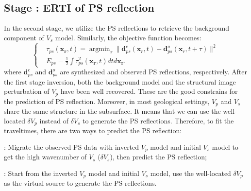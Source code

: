 \subsection{Stage \uppercase\expandafter{}: ERTI of PS reflection}
In the second stage, we utilize the PS reflections to retrieve the background component of
$V_s$ model. Similarly, the objective function becomes:
\begin{equation}
	\left\{
		\begin{aligned}
			&\tau_{ps}(\mathbf{x_r},t)=\mathop{\arg\min}_{\tau}
			\parallel\mathbf{d}^{c}_{ps}(\mathbf{x}_r,t)-\mathbf{d}^{o}_{ps}(\mathbf{x}_r,t+\tau)\parallel^2\\
			&E_{ps}=\frac{1}{2}\int\tau^2_{ps}(\mathbf{x_r},t)dtd\mathbf{x_r}.
		\end{aligned}
	\right.
    \label{eq:ObjectivefunctionPP} 
\end{equation}
where $\mathbf{d}^{c}_{ps}$ and $\mathbf{d}^{o}_{ps}$ are synthesized and observed PS reflections, respectively.
After the first stage inversion, both the background model and the structural image 
perturbation of $V_p$ have been well recovered. These are the good constrains for the prediction 
of PS reflection. Moreover, in
most geological settings, $V_p$ and $V_s$ share the same structure in the subsurface. 
It means that we can use the well-located $\delta V_p$ instead of $\delta V_s$ to generate the PS reflections. 
Therefore, to fit the traveltimes, there are two ways to predict the PS reflection:

{\bf{\uppercase\expandafter{}}}: Migrate the observed PS data with inverted $V_p$ model and
initial $V_s$ model to get the high wavenumber of $V_s$ ($\delta V_s$), then predict the PS reflection;

{\bf{\uppercase\expandafter{}}}: Start from the inverted $V_p$ model and initial $V_s$
model, use the well-located $\delta V_p$ as the virtual source to generate the PS reflections. 


